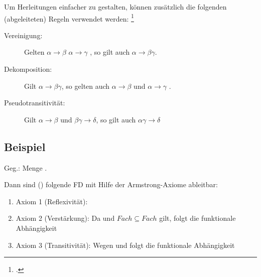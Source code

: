 \documentclass{lehramt-informatik-haupt}
\begin{document}
Um Herleitungen einfacher zu gestalten, können zusätzlich die folgenden
(abgeleiteten) Regeln verwendet werden:
\footcite[Axiome von Armstrong]{wiki:funktionale-abhängigkeit}

%


\begin{description}
\item[Vereinigung:]
%
Gelten
$\alpha \rightarrow \beta$
$\alpha \rightarrow \gamma$ , so gilt auch
$\alpha \rightarrow \beta \gamma$.

\item[Dekomposition:]
%
Gilt
$\alpha \rightarrow \beta \gamma$,
so gelten auch
$\alpha \rightarrow \beta$ und
$\alpha \rightarrow \gamma$ .

\item[Pseudotransitivität:]
%
Gilt
$\alpha \rightarrow \beta$ und
$\beta \gamma \rightarrow \delta$,
so gilt auch
$\alpha \gamma \rightarrow \delta$
\end{description}

\subsection{Beispiel}

Geg.: Menge .

Dann sind (\zB) folgende FD mit Hilfe der Armstrong-Axiome
ableitbar:

\begin{enumerate}
\item Axiom 1 (Reflexivität): 

\item Axiom 2 (Verstärkung): Da  und
${Fach} \subseteq {Fach}$ gilt, folgt die funktionale Abhängigkeit

\item Axiom 3 (Transitivität): Wegen  und
 folgt die funktionale Abhängigkeit
\end{enumerate}

\literatur
\end{document}
